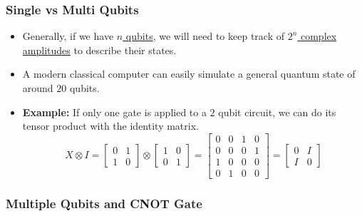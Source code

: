 \documentclass{article}
\begin{document}
\subsubsection{Single vs Multi Qubits}

\begin{itemize}
    \item Generally, if we have \underline{$n$ qubits}, we will need to keep track of \underline{$2^{n}$ complex amplitudes} to describe their states.
    \item A modern classical computer can easily simulate a general quantum state of around $20$ qubits.
    \item \textbf{Example:} If only one gate is applied to a $2$ qubit circuit, we can do its tensor product with the identity matrix.
    \begin{equation*}
        X \otimes I = \begin{bmatrix}
            0 & 1 \\ 1 & 0
        \end{bmatrix}\otimes\begin{bmatrix}
            1 & 0 \\ 0 & 1
        \end{bmatrix} = \begin{bmatrix}
            0&0&1&0 \\ 0&0&0&1 \\ 1&0&0&0 \\ 0&1&0&0
        \end{bmatrix} = \begin{bmatrix}
            0 & I \\ I & 0
        \end{bmatrix}
    \end{equation*}
\end{itemize}

\subsubsection{Multiple Qubits and \textbf{CNOT} Gate}
\end{document}
